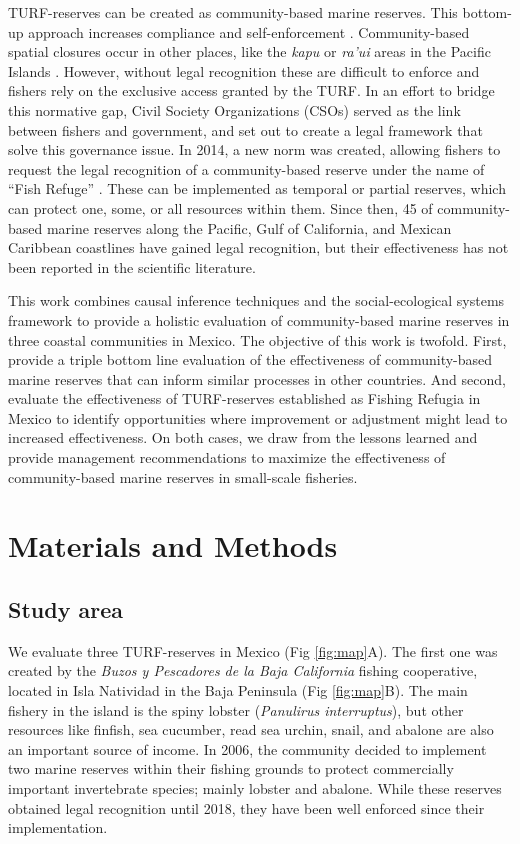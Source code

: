 \documentclass{frontiersSCNS}
\begin{document}
TURF-reserves can be created as community-based marine reserves. This
bottom-up approach increases compliance and self-enforcement
\citep{gelcich_2015-Gw,espinosaromero_2014-PY,beger_2004-Y8}.
Community-based spatial closures occur in other places, like the
\emph{kapu} or \emph{ra'ui} areas in the Pacific Islands
\citep{bohnsack_2004,johannes_2002}. However, without legal recognition
these are difficult to enforce and fishers rely on the exclusive access
granted by the TURF. In an effort to bridge this normative gap, Civil
Society Organizations (CSOs) served as the link between fishers and
government, and set out to create a legal framework that solve this
governance issue. In 2014, a new norm was created, allowing fishers to
request the legal recognition of a community-based reserve under the
name of ``Fish Refuge'' \citep{nom}. These can be implemented as
temporal or partial reserves, which can protect one, some, or all
resources within them. Since then, 45 of community-based marine reserves
along the Pacific, Gulf of California, and Mexican Caribbean coastlines
have gained legal recognition, but their effectiveness has not been
reported in the scientific literature.

This work combines causal inference techniques and the social-ecological
systems framework to provide a holistic evaluation of community-based
marine reserves in three coastal communities in Mexico. The objective of
this work is twofold. First, provide a triple bottom line evaluation of
the effectiveness of community-based marine reserves that can inform
similar processes in other countries. And second, evaluate the
effectiveness of TURF-reserves established as Fishing Refugia in Mexico
to identify opportunities where improvement or adjustment might lead to
increased effectiveness. On both cases, we draw from the lessons learned
and provide management recommendations to maximize the effectiveness of
community-based marine reserves in small-scale fisheries.

\section{Materials and Methods}\label{materials-and-methods}

\subsection{Study area}\label{study-area}

We evaluate three TURF-reserves in Mexico (Fig \ref{fig:map}A). The
first one was created by the \emph{Buzos y Pescadores de la Baja
California} fishing cooperative, located in Isla Natividad in the Baja
Peninsula (Fig \ref{fig:map}B). The main fishery in the island is the
spiny lobster (\emph{Panulirus interruptus}), but other resources like
finfish, sea cucumber, read sea urchin, snail, and abalone are also an
important source of income. In 2006, the community decided to implement
two marine reserves within their fishing grounds to protect commercially
important invertebrate species; mainly lobster and abalone. While these
reserves obtained legal recognition until 2018, they have been well
enforced since their implementation.
\end{document}
